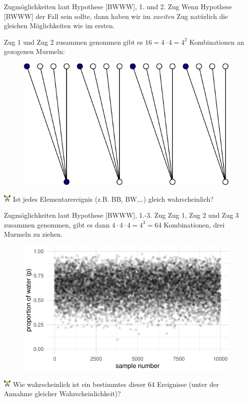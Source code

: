 \documentclass[
  ngerman,
  ignorenonframetext,
]{beamer}
\begin{document}
\begin{frame}{Zugmöglichkeiten laut Hypothese {[}BWWW{]}, 1. und 2. Zug}
\protect\hypertarget{zugmuxf6glichkeiten-laut-hypothese-bwww-1.-und-2.-zug}{}
Wenn Hypothese {[}BWWW{]} der Fall sein sollte, dann haben wir im
\emph{zweiten} Zug natürlich die gleichen Möglichkeiten wie im ersten.

Zug 1 und Zug 2 zusammen genommen gibt es \(16=4\cdot4=4^2\)
Kombinationen an gezogenen Murmeln:

\begin{figure}[H]
\includegraphics[width=0.5\linewidth]{unnamed-chunk-9-1} \end{figure}

\includegraphics[width=1em]{../img/weight.pdf} Ist jedes
Elementarereignis (z.B. BB, BW,\ldots) gleich wahrscheinlich?
\end{frame}

\begin{frame}{Zugmöglichkeiten laut Hypothese {[}BWWW{]}, 1.-3. Zug}
\protect\hypertarget{zugmuxf6glichkeiten-laut-hypothese-bwww-1.-3.-zug}{}
Zug 1, Zug 2 und Zug 3 zusammen genommen, gibt es dann
\(4\cdot4\cdot4=4^3=64\) Kombinationen, drei Murmeln zu ziehen.

\begin{figure}[H]
\includegraphics[width=0.5\linewidth]{unnamed-chunk-10-1} \end{figure}

\includegraphics[width=1em]{../img/weight.pdf} Wie wahrscheinlich ist
ein bestimmtes dieser 64 Ereignisse (unter der Annahme gleicher
Wahrscheinlichkeit)?
\end{frame}
\end{document}
